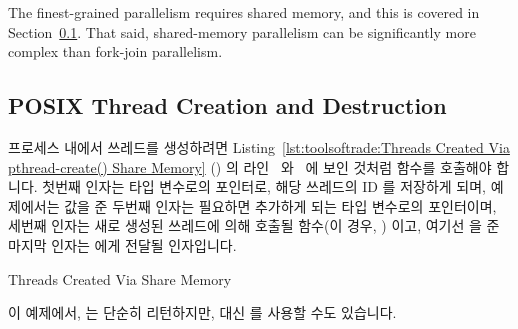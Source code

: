 The finest-grained parallelism requires shared memory, and
this is covered in
Section~\ref{sec:toolsoftrade:POSIX Thread Creation and Destruction}.
That said, shared-memory parallelism can be significantly more complex
than fork-join parallelism.
\fi

\subsection{POSIX Thread Creation and Destruction}
\label{sec:toolsoftrade:POSIX Thread Creation and Destruction}

\begin{lineref}
프로세스 내에서 쓰레드를 생성하려면
Listing~\ref{lst:toolsoftrade:Threads Created Via pthread-create() Share Memory}
() 의 라인~ 와~ 에 보인 것처럼
 함수를 호출해야 합니다.
첫번째 인자는  타입 변수로의 포인터로, 해당 쓰레드의 ID 를
저장하게 되며, 예제에서는  값을 준 두번째 인자는 필요하면 추가하게
되는  타입 변수로의 포인터이며, 세번째 인자는 새로 생성된
쓰레드에 의해 호출될 함수(이 경우, ) 이고, 여기선  을
준 마지막 인자는  에게 전달될 인자입니다.
\end{lineref}

\begin{listing}[tbp]

\caption{Threads Created Via  Share Memory}
\label{lst:toolsoftrade:Threads Created Via pthread-create() Share Memory}
\end{listing}

이 예제에서,  는 단순히 리턴하지만, 대신  를
사용할 수도 있습니다.
\iffalse

